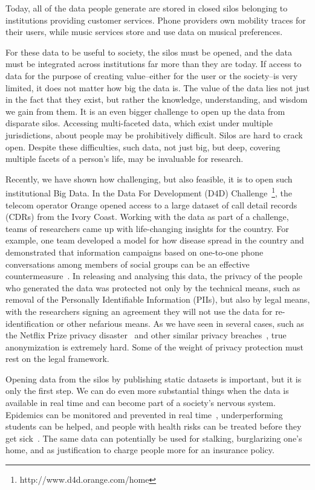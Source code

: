 Today, all of the data people generate are stored in closed silos belonging to institutions providing customer services. 
Phone providers own mobility traces for their users, while music services store and use data on musical preferences.

For these data to be useful to society, the silos must be opened, and the data must be integrated across institutions far more than they are today.
If access to data for the purpose of creating value--either for the user or the society--is very limited, it does not matter how big the data is.
The value of the data lies not just in the fact that they exist, but rather the knowledge, understanding, and wisdom we gain from them. It is an even bigger challenge to open up the data from disparate silos.
Accessing multi-faceted data, which exist under multiple jurisdictions, about people may be prohibitively difficult.
Silos are hard to crack open.
Despite these difficulties, such data, not just big, but deep, covering multiple facets of a person's life, may be invaluable for research.

Recently, we have shown how challenging, but also feasible, it is to open such institutional Big Data.
In the Data For Development (D4D) Challenge~\footnote{http://www.d4d.orange.com/home}, the telecom operator Orange opened access to a large dataset of call detail records (CDRs) from the Ivory Coast.
Working with the data as part of a challenge, teams of researchers came up with life-changing insights for the country. For example, one team developed a model for how disease spread in the country and demonstrated that information campaigns based on one-to-one phone conversations among members of social groups can be an effective countermeasure~\cite{lima2013exploiting}. 
In releasing and analysing this data, the privacy of the people who generated the data was protected not only by the technical means, such as removal of the Personally Identifiable Information (PIIs), but also by legal means, with the researchers signing an agreement they will not use the data for re-identification or other nefarious means.
As we have seen in several cases, such as the Netflix Prize privacy disaster~\cite{narayanan2008robust} and other similar privacy breaches~\cite{sweeney2000simple}, true anonymization is extremely hard.
Some of the weight of privacy protection must rest on the legal framework.

Opening data from the silos by publishing static datasets is important, but it is only the first step.
We can do even more substantial things when the data is available in real time and can become part of a society's nervous system.
Epidemics can be monitored and prevented in real time~\cite{pentland2009using}, underperforming students can be helped, and people with health risks can be treated before they get sick~\cite{tacconi2008activity}. The same data can potentially be used for stalking, burglarizing one's home, and as justification to charge people more for an insurance policy.

